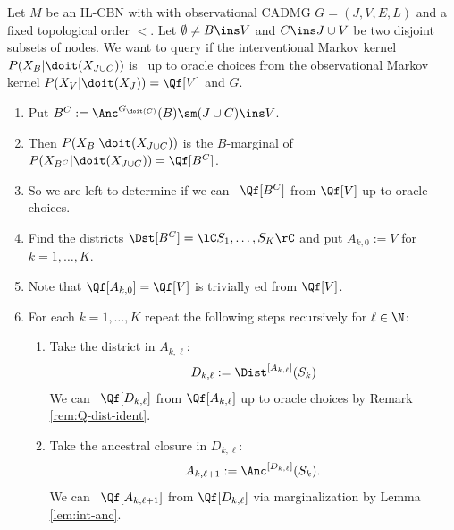 \begin{Alg}[ID-algorithm] \label{alg:id}
    Let $M$ be an IL-CBN with with observational CADMG $G=(J,V,E,L)$ and a fixed topological order $<$.
    Let $\emptyset \neq B \ins V$ and $C \ins J \cup V$ be two disjoint subsets of nodes. 
    We want to query if the interventional Markov kernel $P(X_B|\doit(X_{J \cup C}))$ is \trackable\ up to oracle choices
    from the observational Markov kernel $P(X_V|\doit(X_J))=\Qf[V]$ and $G$.
    \begin{enumerate}
        \item Put $B^C:=\Anc^{G_{\doit(C)}}(B) \sm (J \cup C) \ins V$. 
        \item[] Then $P(X_B|\doit(X_{J \cup C}))$ is the 
            $B$-marginal of $P(X_{B^C}|\doit(X_{J \cup C})) = \Qf[B^C]$.
        \item[] So we are left to determine if we can \track\ $\Qf[B^C]$ from $\Qf[V]$ up to oracle choices.
        \item Find the districts $\Dst[B^C]=\lC S_1,\dots,S_K\rC$ and put $A_{k,0}:=V$ for $k=1,\dots,K$.
        \item[] Note that $\Qf[A_{k,0}]=\Qf[V]$ is trivially \track ed from $\Qf[V]$.
        \item For each $k=1,\dots, K$ repeat the following steps recursively for $\ell \in \N$:
            \begin{enumerate}
                \item Take the district in $A_{k,\ell}$:
                        \[ D_{k,\ell} := \Dist^{[A_{k,\ell}]}(S_k) \]
                        We can \track\ $\Qf[D_{k,\ell}]$ from $\Qf[A_{k,\ell}]$ up to oracle choices by Remark \ref{rem:Q-dist-ident}.
                \item Take the ancestral closure in $D_{k,\ell}$: 
                    \[ A_{k,\ell+1}:=\Anc^{[D_{k,\ell}]}(S_k). \] 
                    We can \track\ $\Qf[A_{k,\ell+1}]$ from $\Qf[D_{k,\ell}]$ via marginalization by Lemma \ref{lem:int-anc}.


\end{enumerate}
\end{enumerate}
\end{Alg}
